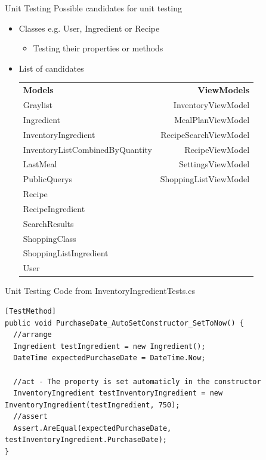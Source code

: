 \begin{frame}[fragile] {Unit Testing} {Possible candidates for unit testing}

	\begin{itemize}
		\item Classes e.g. User, Ingredient or Recipe
			\begin{itemize}
				\item Testing their properties or methods
			\end{itemize}
		\item List of candidates	 	
				{\small
				\begin{tabular} {l r}
							\textbf{Models} & \textbf{ViewModels} \\
							Graylist & {\color{blue} InventoryViewModel} \\
							Ingredient & MealPlanViewModel \\
							{\color{blue}InventoryIngredient} & RecipeSearchViewModel \\
							InventoryListCombinedByQuantity & RecipeViewModel \\
							LastMeal & SettingsViewModel \\
							PublicQuerys & ShoppingListViewModel \\
							Recipe \\
							RecipeIngredient \\
							SearchResults \\
							ShoppingClass \\
							ShoppingListIngredient \\
							User
				\end{tabular}
				}					
	\end{itemize}
		
\end{frame}

\begin{frame}[fragile] {Unit Testing} {Code from InventoryIngredientTests.cs}
		
\begin{lstlisting}
[TestMethod]
public void PurchaseDate_AutoSetConstructor_SetToNow() {
  //arrange
  Ingredient testIngredient = new Ingredient();
  DateTime expectedPurchaseDate = DateTime.Now;

  //act - The property is set automaticly in the constructor
  InventoryIngredient testInventoryIngredient = new InventoryIngredient(testIngredient, 750);
  //assert
  Assert.AreEqual(expectedPurchaseDate, testInventoryIngredient.PurchaseDate); 
}
\end{lstlisting}
	
\end{frame}

